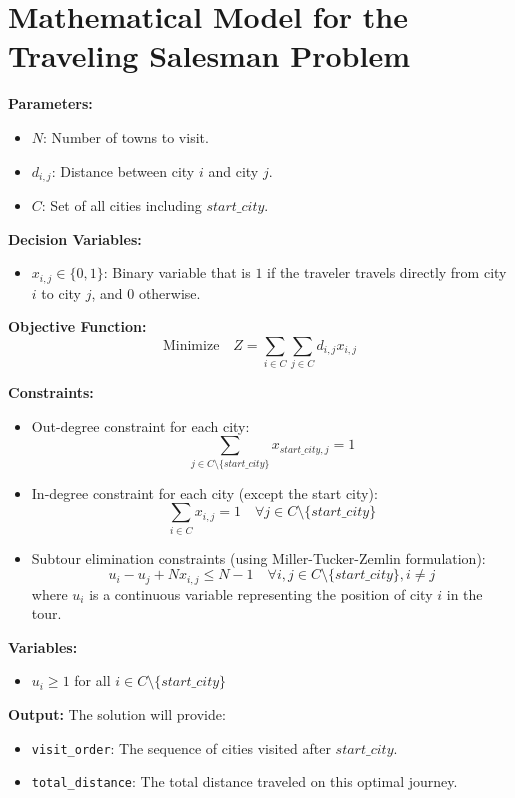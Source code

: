 \documentclass{article}
\begin{document}
\section*{Mathematical Model for the Traveling Salesman Problem}

\textbf{Parameters:}
\begin{itemize}
    \item $N$: Number of towns to visit.
    \item $d_{i,j}$: Distance between city $i$ and city $j$.
    \item $C$: Set of all cities including $start\_city$.
\end{itemize}

\textbf{Decision Variables:}
\begin{itemize}
    \item $x_{i,j} \in \{0, 1\}$: Binary variable that is $1$ if the traveler travels directly from city $i$ to city $j$, and $0$ otherwise.
\end{itemize}

\textbf{Objective Function:}
\[
\text{Minimize} \quad Z = \sum_{i \in C} \sum_{j \in C} d_{i,j} x_{i,j}
\]

\textbf{Constraints:}
\begin{itemize}
    \item Out-degree constraint for each city:
    \[
    \sum_{j \in C \setminus \{start\_city\}} x_{start\_city,j} = 1
    \]
    \item In-degree constraint for each city (except the start city):
    \[
    \sum_{i \in C} x_{i,j} = 1 \quad \forall j \in C \setminus \{start\_city\}
    \]
    \item Subtour elimination constraints (using Miller-Tucker-Zemlin formulation):
    \[
    u_i - u_j + N x_{i,j} \leq N - 1 \quad \forall i,j \in C \setminus \{start\_city\}, i \neq j
    \]
    where $u_i$ is a continuous variable representing the position of city $i$ in the tour.
\end{itemize}

\textbf{Variables:}
\begin{itemize}
    \item $u_i \geq 1$ for all $i \in C \setminus \{start\_city\}$
\end{itemize}

\textbf{Output:}
The solution will provide:
\begin{itemize}
    \item \texttt{visit\_order}: The sequence of cities visited after $start\_city$.
    \item \texttt{total\_distance}: The total distance traveled on this optimal journey.
\end{itemize}
\end{document}
